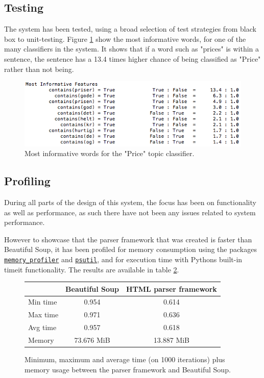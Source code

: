 \documentclass[10pt]{IEEEtran}
\begin{document}
\subsection{Testing}
The system has been tested, using a broad selection of test strategies from black box to unit-testing.
Figure \ref{fig:classification} show the most informative words, for one of the many classifiers in the system. It shows that if a word such as "prices" is within a sentence, the sentence has a 13.4 times higher  chance of being classified as "Price" rather than not being.
\begin{figure}[h!]
	\centering
	\includegraphics[scale=0.48]{informative_priser.png}
	\caption{Most informative words for the "Price" topic classifier. \label{fig:classification}}
\end{figure}


\subsection{Profiling}
During all parts of the design of this system, the focus has been on functionality as well as performance, as such there have not been any issues related to system performance.

However to showcase that the parser framework that was created is faster than Beautiful Soup, it has been profiled for memory consumption using the packages \href{https://pypi.python.org/pypi/memory\_profiler}{\texttt{memory\_profiler}} and \href{http://code.google.com/p/psutil/}{\texttt{psutil}}, and for execution time with Pythons built-in timeit functionality. The results are available in table \ref{fig:profiling}.

\begin{figure}[!h]
	\vspace*{2mm}
	\centering
	\begin{tabular}{ | l | c | c | }
  		\hline
   		 & \textbf{Beautiful Soup} & \textbf{HTML parser framework} \\ \hline
  		Min time & 0.954 & 0.614 \\ \hline
  		Max time & 0.971 & 0.636 \\ \hline
  		Avg time & 0.957 & 0.618 \\ \hline
  		Memory & 73.676 MiB & 13.887 MiB \\ \hline
	\end{tabular}
	\caption{Minimum, maximum and average time (on 1000 iterations) plus memory usage between the parser framework and Beautiful Soup. \label{fig:profiling}}
\end{figure}
\end{document}
